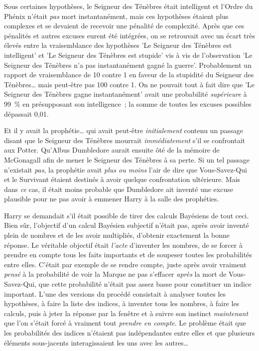 Sous certaines hypothèses, le Seigneur des Ténèbres était intelligent et l'Ordre du Phénix n'était \emph{pas} mort instantanément, mais ces hypothèses étaient plus complexes et se devaient de recevoir une pénalité de complexité. Après que ces pénalités et autres excuses eurent été intégrées, on se retrouvait avec un écart très élevés entre la vraisemblance des hypothèses 'Le Seigneur des Ténèbres est intelligent' et 'Le Seigneur des Ténèbres est stupide' vis à vis de l'observation 'Le Seigneur des Ténèbres n'a pas instantanément gagné la guerre'. Probablement un rapport de vraisemblance de 10 contre 1 en faveur de la stupidité du Seigneur des Ténèbres… mais peut-être pas 100 contre 1. On ne pouvait tout à fait dire que 'Le Seigneur des Ténèbres gagne instantanément' avait une probabilité \emph{supérieure} à 99~\% en présupposant son intelligence~; la somme de toutes les excuses possibles dépassait 0,01.

Et il y avait la prophétie… qui avait peut-être \emph{initialement} contenu un passage disant que le Seigneur des Ténèbres mourrait \emph{immédiatement} s'il se confrontait aux Potter. Qu'Albus Dumbledore aurait ensuite ôté de la mémoire de McGonagall afin de mener le Seigneur des Ténèbres à sa perte. Si un tel passage n'existait \emph{pas}, la prophétie avait \emph{plus ou moins} l'air de dire que Vous-Savez-Qui et le Survivant étaient destinés à avoir quelque confrontation ultérieure. Mais dans \emph{ce} cas, il était moins probable que Dumbledore ait inventé une excuse plausible pour ne pas avoir à emmener Harry à la salle des prophéties.

Harry se demandait s'il était possible de tirer des calculs Bayésiens de tout ceci. Bien sûr, l'objectif d'un calcul Bayésien subjectif n'était pas, après avoir inventé plein de nombres et de les avoir multipliés, d'obtenir exactement la bonne réponse. Le véritable objectif était \emph{l'acte} d'inventer les nombres, de se forcer à prendre en compte tous les faits importants et de soupeser toutes les probabilités entre elles. C'était par exemple de se rendre compte, juste après avoir vraiment \emph{pensé} à la probabilité de voir la Marque ne pas s'effacer \emph{après} la mort de Vous-Savez-Qui, que cette probabilité n'était pas assez basse pour constituer un indice important. L'une des versions du procédé consistait à analyser toutes les hypothèses, à faire la liste des indices, à inventer tous les nombres, à faire les calculs, puis à jeter la réponse par la fenêtre et à suivre son instinct \emph{maintenant} que l'on s'était forcé à vraiment tout \emph{prendre en compte}. Le problème était que les probabilités des indices n'étaient pas indépendantes entre elles et que plusieurs éléments sous-jacents interagissaient les uns avec les autres…

